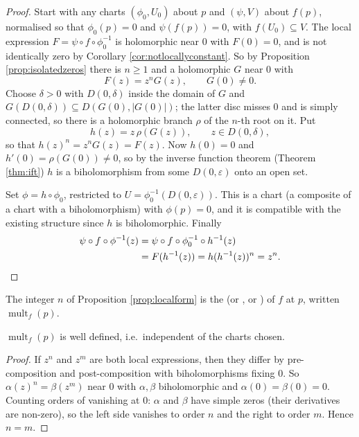 \documentclass[a4paper]{scrartcl}
\newcommand{\mult}{\operatorname{mult}}
\begin{document}
\begin{proof}
	Start with any charts $(\phi_0, U_0)$ about $p$ and $(\psi, V)$ about $f(p)$,
	normalised so that $\phi_0(p) = 0$ and $\psi(f(p)) = 0$, with $f(U_0) \subseteq V$. The
	local expression $F = \psi \circ f \circ \phi_0^{-1}$ is holomorphic near $0$ with
	$F(0) = 0$, and is not identically zero by Corollary \ref{cor:notlocallyconstant}. So by
	Proposition \ref{prop:isolatedzeros} there is $n \geq 1$ and a holomorphic $G$ near $0$
	with
	$$
	F(z) = z^n G(z), \qquad G(0) \neq 0.
	$$
	Choose $\delta > 0$ with $D(0,\delta)$ inside the domain of $G$ and
	$G(D(0,\delta)) \subseteq D(G(0), |G(0)|)$; the latter disc misses $0$ and is
	simply connected, so there is a holomorphic branch $\rho$ of the $n$-th root on it.
	Put
	$$
	h(z) = z\,\rho(G(z)), \qquad z \in D(0,\delta),
	$$
	so that $h(z)^n = z^n G(z) = F(z)$. Now $h(0) = 0$ and
	$h'(0) = \rho(G(0)) \neq 0$, so by the inverse function theorem (Theorem \ref{thm:ift})
	$h$ is a biholomorphism from some $D(0,\varepsilon)$ onto an open set.

	Set $\phi = h \circ \phi_0$, restricted to $U = \phi_0^{-1}(D(0,\varepsilon))$. This is
	a chart (a composite of a chart with a biholomorphism) with $\phi(p) = 0$, and it is
	compatible with the existing structure since $h$ is biholomorphic. Finally
	\begin{align*}
	\psi \circ f \circ \phi^{-1}(z) &= \psi \circ f \circ \phi_0^{-1}\circ h^{-1}(z)\\
	&= F(h^{-1}(z)) = h(h^{-1}(z))^n = z^n. \qedhere
	\end{align*}
\end{proof}

\begin{definition}[Multiplicity]
	The integer $n$ of Proposition \ref{prop:localform} is the  (or
	, or ) of $f$ at $p$, written $\mult_f(p)$.
\end{definition}

\begin{lemma}
	$\mult_f(p)$ is well defined, i.e.\ independent of the charts chosen.
\end{lemma}

\begin{proof}
	If $z^n$ and $z^m$ are both local expressions, then they differ by pre-composition
	and post-composition with biholomorphisms fixing $0$. So $\alpha(z)^n = \beta(z^m)$ near
	$0$ with $\alpha,\beta$ biholomorphic and $\alpha(0)=\beta(0)=0$. Counting orders of
	vanishing at $0$: $\alpha$ and $\beta$ have simple zeros (their derivatives are
	non-zero), so the left side vanishes to order $n$ and the right to order $m$. Hence
	$n=m$.
\end{proof}
\end{document}
